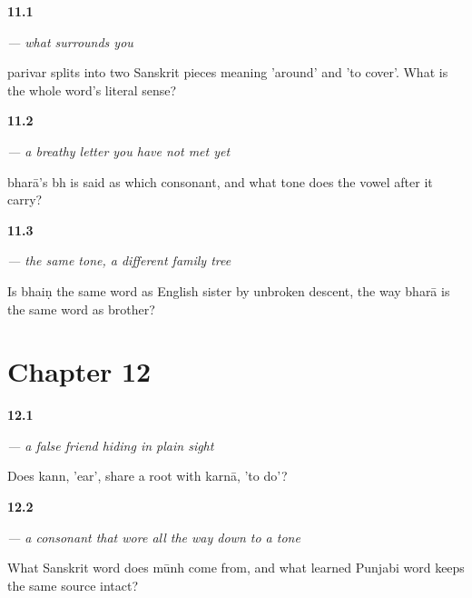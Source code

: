 \noindent\begin{minipage}[t]{\linewidth}
\raggedright
\hypertarget{review-PA-C11-parivar-split}{\textbf{11.1}} \emph{ — what surrounds you}\par
\small parivar splits into two Sanskrit pieces meaning 'around' and 'to cover'. What is the whole word's literal sense?
\end{minipage}\par\medskip

\noindent\begin{minipage}[t]{\linewidth}
\raggedright
\hypertarget{review-PA-C11-bhara-tone}{\textbf{11.2}} \emph{ — a breathy letter you have not met yet}\par
\small bharā's bh is said as which consonant, and what tone does the vowel after it carry?
\end{minipage}\par\medskip

\noindent\begin{minipage}[t]{\linewidth}
\raggedright
\hypertarget{review-PA-C11-bhain-cognate}{\textbf{11.3}} \emph{ — the same tone, a different family tree}\par
\small Is bhaiṇ the same word as English sister by unbroken descent, the way bharā is the same word as brother?
\end{minipage}\par\medskip

\section*{Chapter 12}

\noindent\begin{minipage}[t]{\linewidth}
\raggedright
\hypertarget{review-PA-C12-kann-false-friend}{\textbf{12.1}} \emph{ — a false friend hiding in plain sight}\par
\small Does kann, 'ear', share a root with karnā, 'to do'?
\end{minipage}\par\medskip

\noindent\begin{minipage}[t]{\linewidth}
\raggedright
\hypertarget{review-PA-C12-munh-tone}{\textbf{12.2}} \emph{ — a consonant that wore all the way down to a tone}\par
\small What Sanskrit word does mūnh come from, and what learned Punjabi word keeps the same source intact?
\end{minipage}\par\medskip

